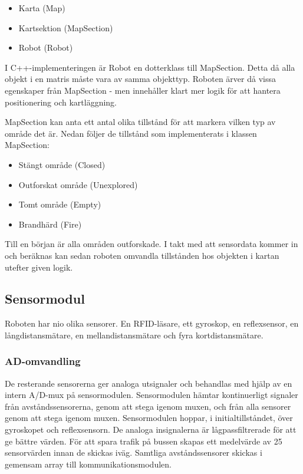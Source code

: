 \documentclass[a4paper,12pt,fleqn]{article}
\begin{document}
\begin{itemize}
	\item Karta (Map)
	\item Kartsektion (MapSection)
	\item Robot (Robot)
\end{itemize}

I C++-implementeringen är Robot en dotterklass till MapSection. Detta då alla objekt i en matris måste vara av samma objekttyp. Roboten ärver då vissa egenskaper från MapSection - men innehåller klart mer logik för att hantera positionering och kartläggning. 

MapSection kan anta ett antal olika tillstånd för att markera vilken typ av område det är. Nedan följer de tillstånd som implementerats i klassen MapSection: 

\begin{itemize}
	\item Stängt område (Closed)
	\item Outforskat område (Unexplored)
	\item Tomt område (Empty)
	\item Brandhärd (Fire)
\end{itemize}

Till en början är alla områden outforskade. I takt med att sensordata kommer in och beräknas kan sedan roboten omvandla tillstånden hos objekten i kartan utefter given logik. 

\subsection{Sensormodul}

Roboten har nio olika sensorer. En RFID-läsare, ett gyroskop, en reflexsensor, en långdistansmätare, en mellandistansmätare och fyra kortdistansmätare. 

\subsubsection{AD-omvandling}
De resterande sensorerna ger analoga utsignaler och behandlas med hjälp av en intern A/D-mux på sensormodulen. 
Sensormodulen hämtar kontinuerligt signaler från avståndssensorerna, genom att stega igenom muxen, och från alla sensorer genom att stega igenom muxen. Sensormodulen hoppar, i initialtillståndet, över gyroskopet och reflexsensorn. De analoga insignalerna är lågpassfiltrerade för att ge bättre värden.
För att spara trafik på bussen skapas ett medelvärde av 25 sensorvärden innan de skickas iväg. Samtliga avståndssensorer skickas i gemensam array till kommunikationsmodulen.
\end{document}
